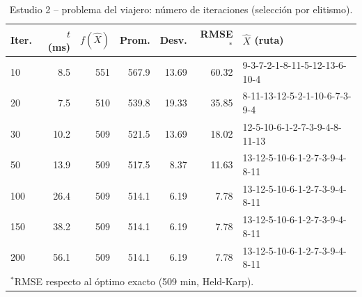 \begin{table}[!t]
\centering
\scriptsize
\setlength{\tabcolsep}{2.5pt}
\caption{Estudio 2 -- problema del viajero: n\'umero de iteraciones (selecci\'on por elitismo).}
\label{tab:t2v}
\begin{tabular}{lrrrrrl}
\hline
Iter. & $t$ (ms) & $f(\hat{X})$ & Prom. & Desv. & RMSE$^*$ & $\hat{X}$ (ruta) \\
\hline
10 & 8.5 & 551 & 567.9 & 13.69 & 60.32 & 9-3-7-2-1-8-11-5-12-13-6-10-4 \\
20 & 7.5 & 510 & 539.8 & 19.33 & 35.85 & 8-11-13-12-5-2-1-10-6-7-3-9-4 \\
30 & 10.2 & 509 & 521.5 & 13.69 & 18.02 & 12-5-10-6-1-2-7-3-9-4-8-11-13 \\
50 & 13.9 & 509 & 517.5 & 8.37 & 11.63 & 13-12-5-10-6-1-2-7-3-9-4-8-11 \\
100 & 26.4 & 509 & 514.1 & 6.19 & 7.78 & 13-12-5-10-6-1-2-7-3-9-4-8-11 \\
150 & 38.2 & 509 & 514.1 & 6.19 & 7.78 & 13-12-5-10-6-1-2-7-3-9-4-8-11 \\
200 & 56.1 & 509 & 514.1 & 6.19 & 7.78 & 13-12-5-10-6-1-2-7-3-9-4-8-11 \\
\hline
\multicolumn{7}{l}{$^*$RMSE respecto al \'optimo exacto (509 min, Held-Karp).}
\end{tabular}
\end{table}
